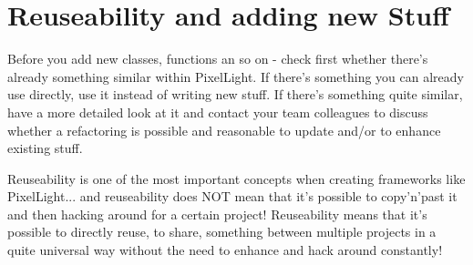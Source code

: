 \section{Reuseability and adding new Stuff}
Before you add new classes, functions an so on - check first whether there's already something similar within PixelLight. If there's something you can already use directly, use it instead of writing new stuff. If there's something quite similar, have a more detailed look at it and contact your team colleagues to discuss whether a refactoring is possible and reasonable to update and/or to enhance existing stuff.

Reuseability is one of the most important concepts when creating frameworks like PixelLight... and reuseability does NOT mean that it's possible to copy'n'past it and then hacking around for a certain project! Reuseability means that it's possible to directly reuse, to share, something between multiple projects in a quite universal way without the need to enhance and hack around constantly!
